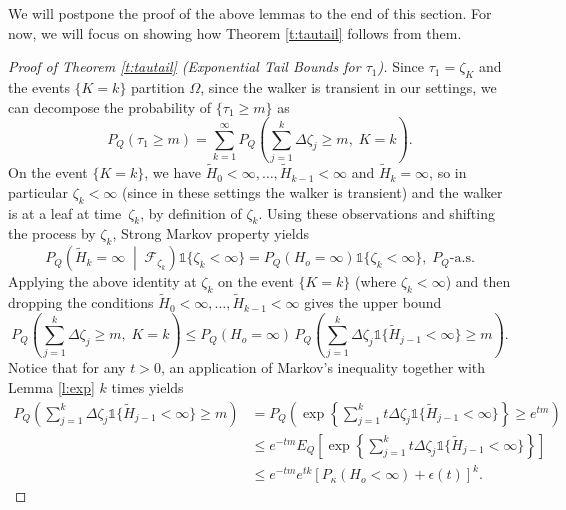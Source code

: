 \documentclass[a4paper]{amsart}
\newcommand{\hitfetak}{\widetilde{H}}
\newcommand{\Lbrace}{\left\lbrace}
\newcommand{\Rbrace}{\right\rbrace}
\begin{document}
We will postpone the proof of the above lemmas to the end of this section. For now, we will focus on showing how Theorem \ref{t:tautail} follows from them.
\begin{proof}[Proof of Theorem \ref{t:tautail} (Exponential Tail Bounds for $\tau_1$)] 
Since $\tau_1 = \zeta_K$ and the events $\{K = k\}$ partition $\Omega$, since the walker is transient in our settings, we can decompose the probability of $\{\tau_1 \ge m\}$ as
\begin{equation}\label{eq:tausum}
    P_Q( \tau_1 \ge m) = \sum_{k=1}^\infty P_Q\left( \sum_{j=1}^{k}\Delta \zeta_j \ge  m, \; K = k\right).
\end{equation}
On the event $\{K = k\}$, we have $\hitfetak_0 < \infty, \dots, \hitfetak_{k-1} < \infty$ and $\hitfetak_k = \infty$, so in particular $\zeta_k < \infty$ (since in these settings the walker is transient) and the walker is at a leaf at time~$\zeta_k$, by definition of $\zeta_k$. Using these observations and shifting the process by $\zeta_k$, Strong Markov property yields
\begin{equation}\label{eq:smpho}
    P_Q\left( \hitfetak_{k} = \infty \; \middle | \; \mathcal{F}_{\zeta_k} \right)\mathds{1}\{\zeta_k <\infty\} = P_Q(H_o = \infty)\mathds{1}\{\zeta_k <\infty\}, \; P_Q\text{-a.s.}
\end{equation}
Applying the above identity at $\zeta_k$ on the event $\{K = k\}$ (where $\zeta_k < \infty$) and then dropping the conditions $\hitfetak_0 < \infty, \dots, \hitfetak_{k-1} < \infty$ gives the upper bound
\begin{equation}\label{eq:bound1}
    P_Q\left( \sum_{j=1}^{k}\Delta \zeta_j \ge  m, \; K = k\right) \le P_Q(H_o = \infty)\,P_Q\left( \sum_{j=1}^{k}\Delta \zeta_j \mathds{1}\{\hitfetak_{j-1} < \infty \}\ge  m\right).
\end{equation}
Notice that for any $t>0$, an application of Markov's inequality together with Lemma \ref{l:exp} $k$ times yields 
\begin{equation}
    \begin{split}
        P_Q\left( \sum_{j=1}^{k}\Delta \zeta_j \mathds{1}\{\hitfetak_{j-1} < \infty \}\ge  m\right) & = P_Q\left( \exp\Lbrace\sum_{j=1}^{k}t\Delta \zeta_j \mathds{1}\{\hitfetak_{j-1} < \infty \} \Rbrace \ge  e^{tm}\right) \\
        & \le e^{-tm}E_Q \left[\exp\Lbrace\sum_{j=1}^{k}t\Delta \zeta_j \mathds{1}\{\hitfetak_{j-1} < \infty \} \Rbrace\right] \\
        & \le e^{-tm}e^{tk}\left[P_\kappa(H_o < \infty) + \epsilon(t)\right]^k.

\end{split}
\end{equation}
\end{proof}
\end{document}
